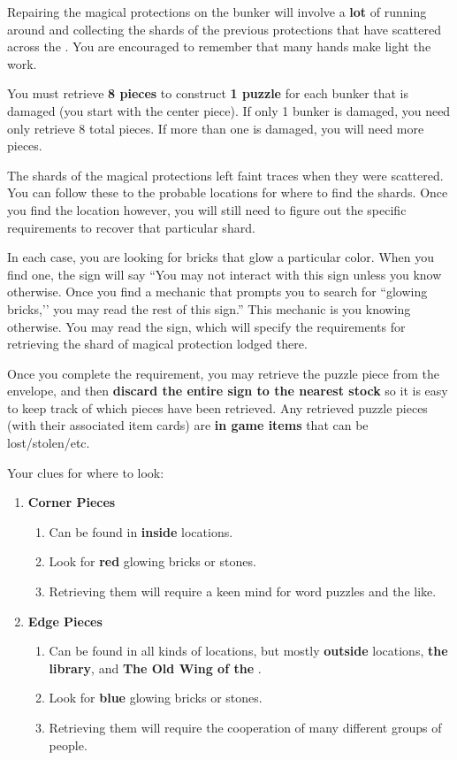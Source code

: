 \documentclass[green]{GL2020}
\begin{document}
\name{\gPhysicalLayer{}}

Repairing the magical protections on the bunker will involve a \textbf{lot} of running around and collecting the shards of the previous protections that have scattered across the \pSc{}. You are encouraged to remember that many hands make light the work.

You must retrieve \textbf{8 pieces} to construct \textbf{1 puzzle} for each bunker that is damaged (you start with the center piece). If only 1 bunker is damaged, you need only retrieve 8 total pieces. If more than one is damaged, you will need more pieces.

The shards of the magical protections left faint traces when they were scattered. You can follow these to the probable locations for where to find the shards. Once you find the location however, you will still need to figure out the specific requirements to recover that particular shard.

In each case, you are looking for bricks that glow a particular color. When you find one, the sign will say “You may not interact with this sign unless you know otherwise. Once you find a mechanic that prompts you to search for ``glowing bricks,’’ you may read the rest of this sign.” This mechanic is you knowing otherwise. You may read the sign, which will specify the requirements for retrieving the shard of magical protection lodged there.

Once you complete the requirement, you may retrieve the puzzle piece from the envelope, and then \textbf{discard the entire sign to the nearest stock} so it is easy to keep track of which pieces have been retrieved. Any retrieved puzzle pieces (with their associated item cards) are \textbf{in game items} that can be lost/stolen/etc.

Your clues for where to look:
\begin{enumerate}
  \item \textbf{Corner Pieces}
  \begin{enumerate}
    \item Can be found in \textbf{inside} locations.
    \item Look for \textbf{red} glowing bricks or stones.
    \item Retrieving them will require a keen mind for word puzzles and the like.
  \end{enumerate}  
  \item \textbf{Edge Pieces}
  \begin{enumerate}
    \item Can be found in all kinds of locations, but mostly \textbf{outside} locations, \textbf{the library}, and \textbf{The Old Wing of the \pSc{}}.
    \item Look for \textbf{blue} glowing bricks or stones.
    \item Retrieving them will require the cooperation of many different groups of people.
  \end{enumerate}  
\end{enumerate}
\end{document}
